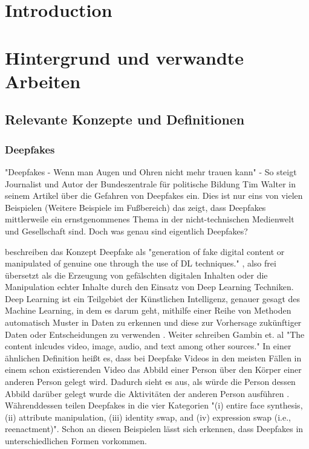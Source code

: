 %
%


\chapter{Introduction}
\label{sec:introduction}

\chapter{Hintergrund und verwandte Arbeiten}
\section{Relevante Konzepte und Definitionen}
\subsection{Deepfakes}
"Deepfakes - Wenn man Augen und Ohren nicht mehr trauen kann" \cite{bildungDeepfakesWennMan2023} - 
So steigt Journalist und Autor der Bundeszentrale für politische Bildung Tim Walter in seinem Artikel über die Gefahren von Deepfakes ein. 
Dies ist nur eins von vielen Beispielen (Weitere Beispiele im Fußbereich) das zeigt, 
dass Deepfakes mittlerweile ein ernstgenommenes Thema in der nicht-technischen Medienwelt und Gesellschaft sind. 
Doch was genau sind eigentlich Deepfakes? 

\textcite{gambinDeepfakesCurrentFuture2024} beschreiben das Konzept Deepfake als "generation of fake digital content or manipulated of genuine one through the use of DL techniques." \cite[S. ?]{gambinDeepfakesCurrentFuture2024},
also frei übersetzt als die Erzeugung von gefälschten digitalen Inhalten oder die Manipulation echter Inhalte durch den Einsatz von Deep Learning Techniken. 
Deep Learning ist ein Teilgebiet der Künstlichen Intelligenz, genauer gesagt des Machine Learning, in dem es darum geht, mithilfe einer Reihe von Methoden automatisch Muster in Daten zu erkennen und diese zur Vorhersage zukünftiger Daten oder Entscheidungen zu verwenden \autocite[S. 1]{murphyMachineLearningProbabilistic2012} . 
Weiter schreiben Gambin et. al "The content inlcudes video, image, audio, and text among other sources." 
In einer ähnlichen Definition heißt es, dass bei Deepfake Videos in den meisten Fällen in einem schon existierenden Video das Abbild einer Person über den Körper einer anderen Person gelegt wird. 
Dadurch sieht es aus, als würde die Person dessen Abbild darüber gelegt wurde die Aktivitäten der anderen Person ausführen \autocite{harrisVideoDemandWhat2021}.
Währenddessen teilen \textcite{juefei-xuCounteringMaliciousDeepFakes2022} Deepfakes in die vier Kategorien "(i) entire face synthesis, (ii) attribute manipulation, (iii) identity swap, and (iv) expression swap (i.e., reenactment)". 
Schon an diesen Beispielen lässt sich erkennen, dass Deepfakes in unterschiedlichen Formen vorkommen.

